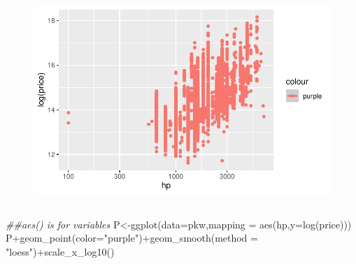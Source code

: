 \documentclass[
  letterpaper,
  DIV=11,
  numbers=noendperiod]{scrartcl}
\newenvironment{Shaded}{\begin{snugshade}}{\end{snugshade}}
\newcommand{\AttributeTok}[1]{\textcolor[rgb]{0.40,0.45,0.13}{#1}}
\newcommand{\DocumentationTok}[1]{\textcolor[rgb]{0.37,0.37,0.37}{\textit{#1}}}
\newcommand{\FunctionTok}[1]{\textcolor[rgb]{0.28,0.35,0.67}{#1}}
\newcommand{\NormalTok}[1]{\textcolor[rgb]{0.00,0.23,0.31}{#1}}
\newcommand{\OtherTok}[1]{\textcolor[rgb]{0.00,0.23,0.31}{#1}}
\newcommand{\SpecialCharTok}[1]{\textcolor[rgb]{0.37,0.37,0.37}{#1}}
\newcommand{\StringTok}[1]{\textcolor[rgb]{0.13,0.47,0.30}{#1}}
\begin{document}
\begin{figure}[H]

{\centering \includegraphics[width=17.1875in,height=\textheight]{pakwheels_files/figure-pdf/unnamed-chunk-29-5.pdf}

}

\end{figure}

\hypertarget{section-3}{%
\subsection{}\label{section-3}}

\begin{Shaded}
\begin{Highlighting}[]
\DocumentationTok{\#\#aes() is for variables}
\NormalTok{P}\OtherTok{\textless{}{-}}\FunctionTok{ggplot}\NormalTok{(}\AttributeTok{data=}\NormalTok{pkw,}\AttributeTok{mapping =} \FunctionTok{aes}\NormalTok{(hp,}\AttributeTok{y=}\FunctionTok{log}\NormalTok{(price)))}
\NormalTok{P}\SpecialCharTok{+}\FunctionTok{geom\_point}\NormalTok{(}\AttributeTok{color=}\StringTok{"purple"}\NormalTok{)}\SpecialCharTok{+}\FunctionTok{geom\_smooth}\NormalTok{(}\AttributeTok{method =} \StringTok{"loess"}\NormalTok{)}\SpecialCharTok{+}\FunctionTok{scale\_x\_log10}\NormalTok{()}
\end{Highlighting}
\end{Shaded}

\hypertarget{section-4}{%
\subsection{}\label{section-4}}
\end{document}
